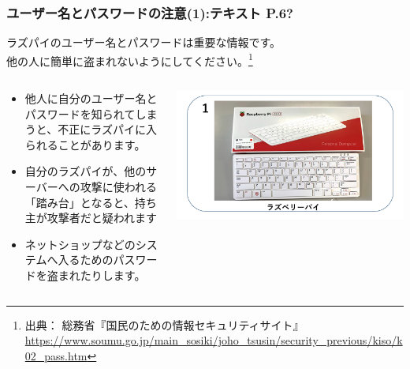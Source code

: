 \documentclass[dvipdfmx]{beamer}
\begin{document}
\begin{frame}[fragile]
	\frametitle{ユーザー名とパスワードの注意(1):テキスト P.6?~~~}
	ラズパイのユーザー名とパスワードは重要な情報です。\\
	他の人に簡単に盗まれないようにしてください。\footnote{出典： 総務省『国民のための情報セキュリティサイト』\url{https://www.soumu.go.jp/main_sosiki/joho_tsusin/security_previous/kiso/k02_pass.htm}
	}
	\begin{columns}[b]
		\begin{column}{0.8\textwidth}
				\begin{itemize}
					\item 他人に自分のユーザー名とパスワードを知られてしまうと、不正にラズパイに入られることがあります。
					\item 自分のラズパイが、他のサーバーへの攻撃に使われる「踏み台」となると、持ち主が攻撃者だと疑われます
					\item ネットショップなどのシステムへ入るためのパスワードを盗まれたりします。
				\end{itemize}
				\end{column}
		\begin{column}{0.2\textwidth}
	 \includegraphics[width=\textwidth]{textbook-img009-2023.png}
				\end{column}
				\end{columns}

\end{frame}
\end{document}

